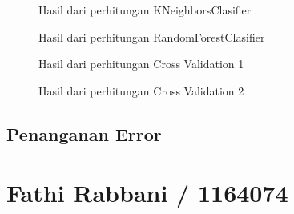 \begin{enumerate}
\begin{figure}[!htbp]
      \caption{Hasil dari perhitungan KNeighborsClasifier}
      \label{c109}
      \end{figure}

\begin{figure}[!htbp]
      \caption{Hasil dari perhitungan RandomForestClasifier}
      \label{c110}
      \end{figure}

\begin{figure}[!htbp]
      \caption{Hasil dari perhitungan Cross Validation 1}
      \label{c111}
      \end{figure}

\begin{figure}[!htbp]
      \caption{Hasil dari perhitungan Cross Validation 2}
      \label{c112}
      \end{figure}

\end{enumerate}
\subsection{Penanganan Error}



\section{Fathi Rabbani / 1164074}
